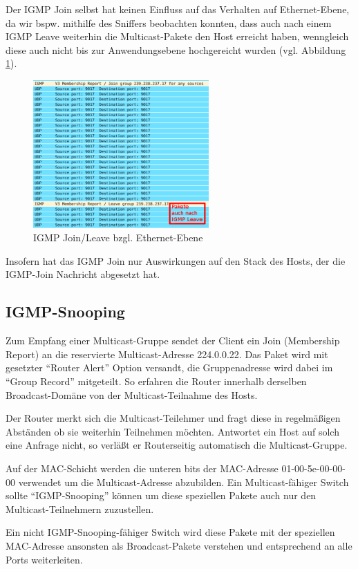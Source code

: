 \documentclass[a4paper,10pt]{article}
\begin{document}
Der IGMP Join selbst hat keinen Einfluss auf das Verhalten auf Ethernet-Ebene,
da wir bspw. mithilfe des Sniffers beobachten konnten, 
dass auch nach einem IGMP Leave weiterhin die Multicast-Pakete den Host erreicht haben,
wenngleich diese auch nicht bis zur Anwendungsebene hochgereicht wurden (vgl. Abbildung \ref{multicast_after_leave}).

\begin{figure}[h]
	\begin{center}
		\includegraphics[width=0.6\textwidth]{multicast_after_leave.png}
	\end{center}

	\caption{IGMP Join/Leave bzgl. Ethernet-Ebene}

	\label{multicast_after_leave}
\end{figure}

Insofern hat das IGMP Join nur Auswirkungen auf den Stack des Hosts, 
der die IGMP-Join Nachricht abgesetzt hat.

\subsection{IGMP-Snooping}

Zum Empfang einer Multicast-Gruppe sendet der Client ein Join (Membership Report) an die reservierte Multicast-Adresse 224.0.0.22. Das Paket wird mit gesetzter "`Router Alert"' Option versandt, die Gruppenadresse wird dabei im "`Group Record"' mitgeteilt. So erfahren die Router innerhalb derselben Broadcast-Domäne von der Multicast-Teilnahme des Hosts.

Der Router merkt sich die Multicast-Teilehmer und fragt diese in regelmäßigen Abständen ob sie weiterhin Teilnehmen möchten. Antwortet ein Host auf solch eine Anfrage nicht, so verläßt er Routerseitig automatisch die Multicast-Gruppe.

Auf der MAC-Schicht werden die unteren bits der MAC-Adresse 01-00-5e-00-00-00 verwendet um die Multicast-Adresse abzubilden. Ein Multicast-fähiger Switch sollte "`IGMP-Snooping"' können um diese speziellen Pakete auch nur den Multicast-Teilnehmern zuzustellen.

Ein nicht IGMP-Snooping-fähiger Switch wird diese Pakete mit der speziellen MAC-Adresse
ansonsten als Broadcast-Pakete verstehen und entsprechend an alle Ports weiterleiten.
\end{document}
